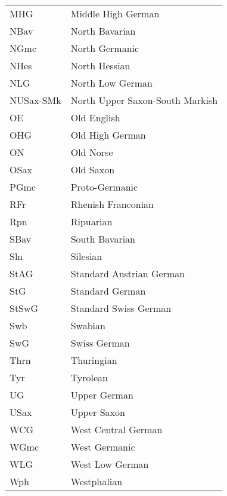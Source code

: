 {\begin{tabularx}{.5\textwidth}[t]{lQ@{}}
MHG &  Middle High German\\
NBav & North Bavarian\\
NGmc & North Germanic\\
NHes & North Hessian\\
NLG & North Low German\\
NUSax-SMk & North Upper Saxon-South Markish\\
OE & Old English\\
OHG & Old High German\\
ON & Old Norse\\
OSax & Old Saxon\\
PGmc & Proto-Germanic\\
RFr & Rhenish Franconian\\
Rpn & Ripuarian\\
SBav & South Bavarian\\
Sln & Silesian\\
StAG & Standard Austrian German\\
StG & Standard German\\
StSwG & Standard Swiss German\\
Swb & Swabian\\
SwG & Swiss German\\
Thrn & Thuringian\\
Tyr & Tyrolean\\
UG & Upper German\\
USax & Upper Saxon\\
WCG & West Central German\\
WGmc & West Germanic\\
WLG & West Low German\\
Wph & Westphalian
\end{tabularx}}\clearpage

